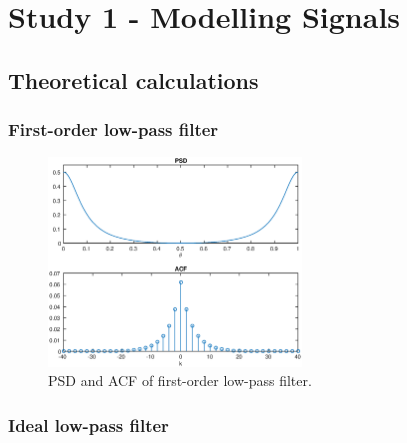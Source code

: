 \section{Study 1 - Modelling Signals}


\subsection{Theoretical calculations}


\subsubsection{First-order low-pass filter}

\begin{figure}[h]
\centering
\includegraphics[width=0.6\textwidth]{bilder/Lab1/Lab1fig1.eps}
\caption{PSD and ACF of first-order low-pass filter.}
\label{fig:Lab1fig1}
\end{figure}


\subsubsection{Ideal low-pass filter}

